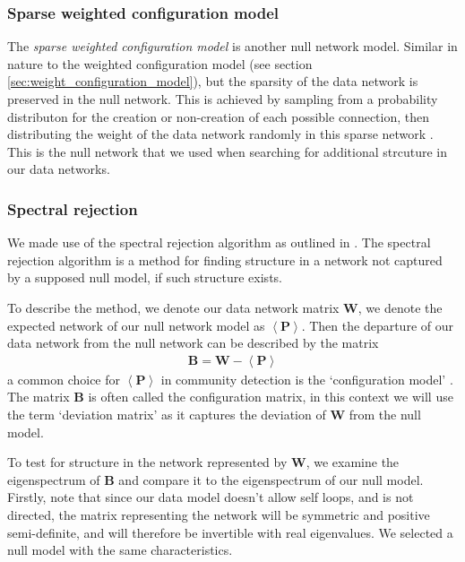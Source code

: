 \documentclass[a4paper,12pt]{article}
\theoremstyle{definition}
\begin{document}
        \subsubsection{Sparse weighted configuration model}\label{sec:sparse_weighted_configuration_model}
        The \textit{sparse weighted configuration model} is another null network model. Similar in nature to the weighted configuration model (see section \ref{sec:weight_configuration_model}), but the sparsity of the data network is preserved in the null network. This is achieved by sampling from a probability distributon for the creation or non-creation of each possible connection, then distributing the weight of the data network randomly in this sparse network \cite{humphries}. This is the null network that we used when searching for additional strcuture in our data networks.

        \subsubsection{Spectral rejection}\label{sec:spectral_rejection}
        We made use of the spectral rejection algorithm as outlined in \cite{humphries}. The spectral rejection algorithm is a method for finding structure in a network not captured by a supposed null model, if such structure exists. 
        
        To describe the method, we denote our data network matrix $\mathbf{W}$, we denote the expected network of our null network model as $\left\langle \mathbf{P} \right\rangle$. Then the departure of our data network from the null network can be described by the matrix
        \begin{align}
          \mathbf{B} = \mathbf{W} - \left\langle \mathbf{P} \right\rangle
        \end{align}
        a common choice for $\left\langle \mathbf{P} \right\rangle$ in community detection is the `configuration model' \cite{fosdick, humphries2}. The matrix $\mathbf{B}$ is often called the configuration matrix, in this context we will use the term `deviation matrix' as it captures the deviation of $\mathbf{W}$ from the null model. 

        To test for structure in the network represented by $\mathbf{W}$, we examine the eigenspectrum of $\mathbf{B}$ and compare it to the eigenspectrum of our null model. Firstly, note that since our data model doesn't allow self loops, and is not directed, the matrix representing the network will be symmetric and positive semi-definite, and will therefore be invertible with real eigenvalues. We selected a null model with the same characteristics. 
        
\end{document}
